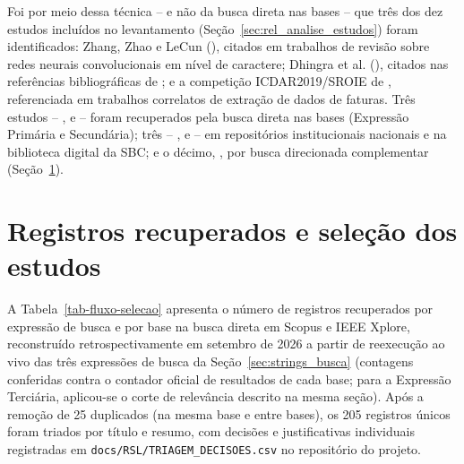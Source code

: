 \begin{apendicesenv}
Foi por meio dessa técnica -- e não da busca direta nas bases -- que três dos dez estudos incluídos no levantamento (Seção~\ref{sec:rel_analise_estudos}) foram identificados: Zhang, Zhao e LeCun (\citeyear{zhang2015character}), citados em trabalhos de revisão sobre redes neurais convolucionais em nível de caractere; Dhingra et al. (\citeyear{dhingra2016tweet2vec}), citados nas referências bibliográficas de ; e a competição ICDAR2019/SROIE de , referenciada em trabalhos correlatos de extração de dados de faturas. Três estudos -- ,  e  -- foram recuperados pela busca direta nas bases (Expressão Primária e Secundária); três -- ,  e  -- em repositórios institucionais nacionais e na biblioteca digital da SBC; e o décimo, , por busca direcionada complementar (Seção~\ref{sec:fluxo_selecao}).

\section{Registros recuperados e seleção dos estudos}
\label{sec:fluxo_selecao}

A Tabela~\ref{tab-fluxo-selecao} apresenta o número de registros recuperados por expressão de busca e por base na busca direta em Scopus e IEEE Xplore, reconstruído retrospectivamente em setembro de 2026 a partir de reexecução ao vivo das três expressões de busca da Seção~\ref{sec:strings_busca} (contagens conferidas contra o contador oficial de resultados de cada base; para a Expressão Terciária, aplicou-se o corte de relevância descrito na mesma seção). Após a remoção de 25 duplicados (na mesma base e entre bases), os 205 registros únicos foram triados por título e resumo, com decisões e justificativas individuais registradas em \texttt{docs/RSL/TRIAGEM\_DECISOES.csv} no repositório do projeto.


\end{apendicesenv}
